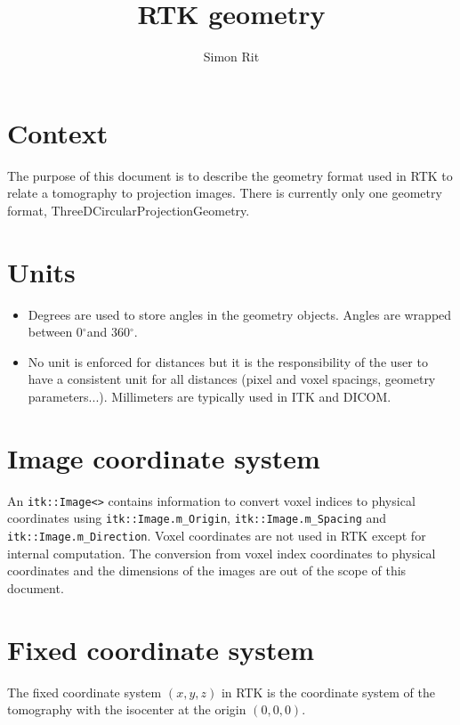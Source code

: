 \documentclass{article}
\newcommand{\degree}{\ensuremath{^\circ}}
\begin{document}
\title{RTK geometry}
\author{Simon Rit}

\maketitle

\section{Context}

The purpose of this document is to describe the geometry format used in RTK to relate a tomography to projection images. There is currently only one geometry format, ThreeDCircularProjectionGeometry.

\section{Units}

\begin{itemize}
 \item Degrees are used to store angles in the geometry objects. Angles are wrapped between 0\degree and 360\degree.
 \item No unit is enforced for distances but it is the responsibility of the user to have a consistent unit for all distances (pixel and voxel spacings, geometry parameters...). Millimeters are typically used in ITK and DICOM.
\end{itemize}

\section{Image coordinate system}

An \verb+itk::Image<>+ contains information to convert voxel indices to physical coordinates using \verb+itk::Image.m_Origin+, \verb+itk::Image.m_Spacing+ and \verb+itk::Image.m_Direction+. Voxel coordinates are not used in RTK except for internal computation. The conversion from voxel index coordinates to physical coordinates and the dimensions of the images are out of the scope of this document.

\section{Fixed coordinate system}

The fixed coordinate system $(x,y,z)$ in RTK is the coordinate system of the tomography with the isocenter at the origin $(0,0,0)$.
\end{document}
